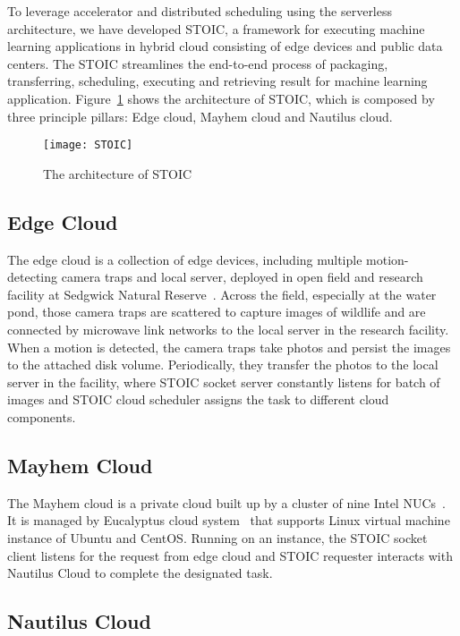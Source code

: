 To leverage accelerator and distributed scheduling using the serverless architecture, we have developed STOIC, a framework for executing machine learning applications in hybrid cloud consisting of edge devices and public data centers. The STOIC streamlines the end-to-end process of packaging, transferring, scheduling, executing and retrieving result for machine learning application. Figure~\ref{fig:STOIC} shows the architecture of STOIC, which is composed by three principle pillars: Edge cloud, Mayhem cloud and Nautilus cloud.

\begin{figure}[t] \centering 
\texttt{[image: STOIC]}
\caption{The architecture of STOIC
\label{fig:STOIC}}
\end{figure}

\subsection{Edge Cloud}
 The edge cloud is a collection of edge devices, including multiple motion-detecting camera traps and local server, deployed in open field and research facility at Sedgwick Natural Reserve~\cite{ref:sedgwick}. Across the field, especially at the water pond, those camera traps are scattered to capture images of wildlife and are connected by microwave link networks to the local server in the research facility. When a motion is detected, the camera traps take photos and persist the images to the attached disk volume. Periodically, they transfer the photos to the local server in the facility, where STOIC socket server constantly listens for batch of images and STOIC cloud scheduler assigns the task to different cloud components. 
 
 \subsection{Mayhem Cloud}
 
 The Mayhem cloud is a private cloud built up by a cluster of nine Intel NUCs~\cite{ref:nucs}. It is managed by Eucalyptus cloud system~\cite{ref:euca} that supports Linux virtual machine instance of Ubuntu and CentOS. Running on an instance, the STOIC socket client listens for the request from edge cloud and STOIC requester interacts with Nautilus Cloud to complete the designated task.
 
 \subsection{Nautilus Cloud}
 
